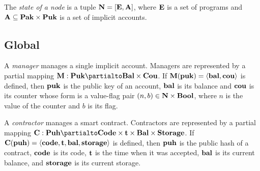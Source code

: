 \documentclass[a4paper]{llncs}
\begin{document}
\begin{mathpar}
\end{mathpar}

\begin{definition}%
  The \emph{state of a node} is a tuple
  $\NODE = [ \EXPRS, \ACCOUNTS
  ]$, where $\EXPRS$ is a
  set of programs and $\ACCOUNTS \subseteq \TPAK \times \TPUK$  is a set of
  implicit accounts.
\end{definition}


\subsection{Global}
\label{sec:global}



\begin{definition}%
A \emph{manager} manages a single implicit account. Managers are
represented by a partial mapping $\MANAGERS : \TPUK \partialto \TBAL
\times \TCOU$. If $\MANAGERS (\PUK) = \Angle{\BAL, \COU}$ is defined, then  $\PUK$ is the
public key of an account, $\BAL$ is its
balance and $\COU$ is its counter whose form is a value-flag pair
$(n,b) \in \Nat\times\TBOOL$, where $n$ is the value of the counter
and ${b}$ is its flag.   
\end{definition}

\begin{definition}%
  A \emph{contractor} manages a smart contract. Contractors are
  represented by a partial mapping $\CONTRACTORS : \TPUH \partialto
  \TCODE \times \TIME  \times \TBAL \times  \TSTORAGE$. If $\CONTRACTORS (\PUH) = \langle
  \CODE, \TIME, \BAL, \STORAGE \rangle $ is defined, then $\PUH$ is the
  public hash of a contract,
  $\CODE$ is its  code,
  $\TIME$ is the time when it was accepted,
  $\BAL$ is its current balance,
  and $\STORAGE$ is its current storage.
\end{definition}
\end{document}
